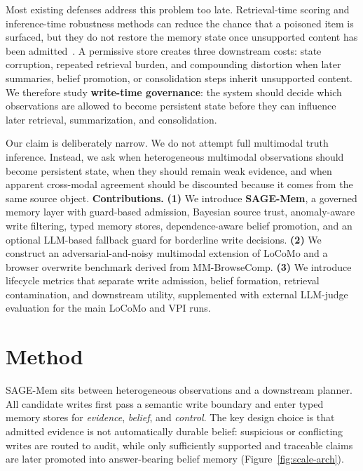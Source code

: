 \documentclass{article}
\begin{document}
Most existing defenses address this problem too late. Retrieval-time scoring and inference-time robustness methods can reduce the chance that a poisoned item is surfaced, but they do not restore the memory state once unsupported content has been admitted~\cite{ref4,ref5,ref6,ref7}. A permissive store creates three downstream costs: state corruption, repeated retrieval burden, and compounding distortion when later summaries, belief promotion, or consolidation steps inherit unsupported content. We therefore study \textbf{write-time governance}: the system should decide which observations are allowed to become persistent state before they can influence later retrieval, summarization, and consolidation.

Our claim is deliberately narrow. We do not attempt full multimodal truth inference. Instead, we ask when heterogeneous multimodal observations should become persistent state, when they should remain weak evidence, and when apparent cross-modal agreement should be discounted because it comes from the same source object. \textbf{Contributions.} \textbf{(1)} We introduce \textbf{SAGE-Mem}, a governed memory layer with guard-based admission, Bayesian source trust, anomaly-aware write filtering, typed memory stores, dependence-aware belief promotion, and an optional LLM-based fallback guard for borderline write decisions. \textbf{(2)} We construct an adversarial-and-noisy multimodal extension of LoCoMo and a browser overwrite benchmark derived from MM-BrowseComp. \textbf{(3)} We introduce lifecycle metrics that separate write admission, belief formation, retrieval contamination, and downstream utility, supplemented with external LLM-judge evaluation for the main LoCoMo and VPI runs.

\section{Method}

SAGE-Mem sits between heterogeneous observations and a downstream planner. All candidate writes first pass a semantic write boundary and enter typed memory stores for \emph{evidence}, \emph{belief}, and \emph{control}. The key design choice is that admitted evidence is not automatically durable belief: suspicious or conflicting writes are routed to audit, while only sufficiently supported and traceable claims are later promoted into answer-bearing belief memory (Figure~\ref{fig:scale-arch}).
\end{document}
